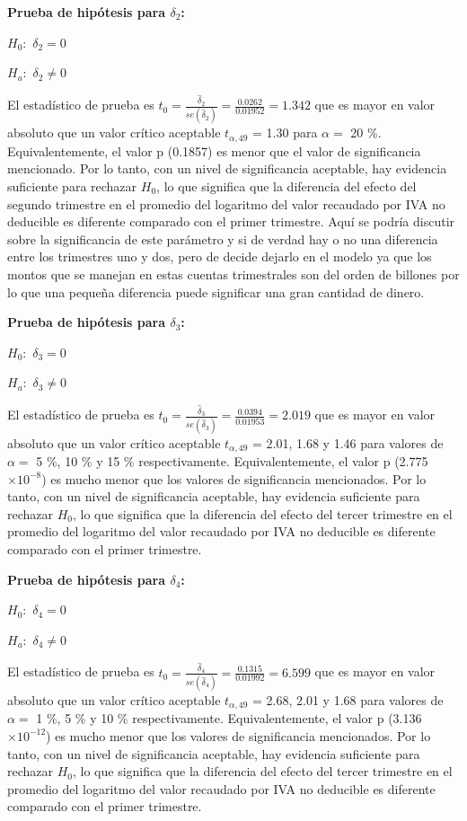 \documentclass[11pt, letterpaper, twoside]{article}
\begin{document}
\textbf{Prueba de hipótesis para $\delta_2$:}

$H_0:$ $\delta_2 = 0$

$H_a:$ $\delta_2 \neq 0$

El estadístico de prueba es $t_0=\frac{\hat{\delta}_2}{se(\hat{\delta}_2)}=\frac{0.0262}{0.01952}=1.342$ que es mayor en valor absoluto que un valor crítico aceptable $t_{\alpha,49}$ =  1.30 para $\alpha =$ 20 \%. Equivalentemente, el valor p (0.1857) es menor que el valor de significancia mencionado. Por lo tanto, con un nivel de significancia aceptable, hay evidencia suficiente para rechazar $H_0$, lo que significa que la diferencia del efecto del segundo trimestre en el promedio del logaritmo del valor recaudado por IVA no deducible es diferente comparado con el primer trimestre. Aquí se podría discutir sobre la significancia de este parámetro y si de verdad hay o no una diferencia entre los trimestres uno y dos, pero de decide dejarlo en el modelo ya que los montos que se manejan en estas cuentas trimestrales son del orden de billones por lo que una pequeña diferencia puede significar una gran cantidad de dinero.

\textbf{Prueba de hipótesis para $\delta_3$:}

$H_0:$ $\delta_3 = 0$

$H_a:$ $\delta_3 \neq 0$

El estadístico de prueba es $t_0=\frac{\hat{\delta}_3}{se(\hat{\delta}_3)}=\frac{0.0394}{0.01953}=2.019$ que es mayor en valor absoluto que un valor crítico aceptable $t_{\alpha,49}$ =  2.01, 1.68 y 1.46 para valores de $\alpha =$ 5 \%, 10 \% y 15 \% respectivamente. Equivalentemente, el valor p (2.775$\times10^{-8}$) es mucho menor que los valores de significancia mencionados. Por lo tanto, con un nivel de significancia aceptable, hay evidencia suficiente para rechazar $H_0$, lo que significa que la diferencia del efecto del tercer trimestre en el promedio del logaritmo del valor recaudado por IVA no deducible es diferente comparado con el primer trimestre.


\textbf{Prueba de hipótesis para $\delta_4$:}

$H_0:$ $\delta_4 = 0$

$H_a:$ $\delta_4 \neq 0$

El estadístico de prueba es $t_0=\frac{\hat{\delta}_4}{se(\hat{\delta}_4)}=\frac{0.1315}{0.01992}=6.599$ que es mayor en valor absoluto que un valor crítico aceptable $t_{\alpha,49}$ =  2.68, 2.01 y 1.68 para valores de $\alpha =$ 1 \%, 5 \% y 10 \% respectivamente. Equivalentemente, el valor p (3.136$\times10^{-12}$) es mucho menor que los valores de significancia mencionados. Por lo tanto, con un nivel de significancia aceptable, hay evidencia suficiente para rechazar $H_0$, lo que significa que la diferencia del efecto del tercer trimestre en el promedio del logaritmo del valor recaudado por IVA no deducible es diferente comparado con el primer trimestre.
\end{document}
